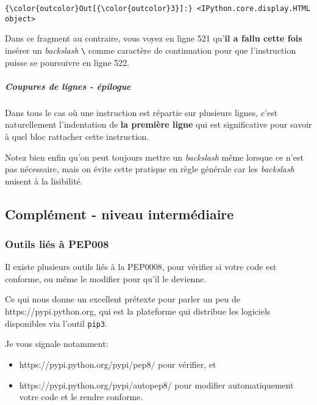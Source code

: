 \begin{Verbatim}[commandchars=\\\{\}]
{\color{outcolor}Out[{\color{outcolor}3}]:} <IPython.core.display.HTML object>
\end{Verbatim}
            
    Dans ce fragment au contraire, vous voyez en ligne 521 qu'\textbf{il a
fallu cette fois} insérer un \emph{backslash} \texttt{\textbackslash{}}
comme caractère de continuation pour que l'instruction puisse se
poursuivre en ligne 522.

    \hypertarget{coupures-de-lignes---uxe9pilogue}{%
\subparagraph{Coupures de lignes -
épilogue}\label{coupures-de-lignes---uxe9pilogue}}

    Dans tous le cas où une instruction est répartie sur plusieurs lignes,
c'est naturellement l'indentation de \textbf{la première ligne} qui est
significative pour savoir à quel bloc rattacher cette instruction.

    Notez bien enfin qu'on peut toujours mettre un \emph{backslash} même
lorsque ce n'est pas nécessaire, mais on évite cette pratique en règle
générale car les \emph{backslash} nuisent à la lisibilité.

    \hypertarget{compluxe9ment---niveau-intermuxe9diaire}{%
\subsection{Complément - niveau
intermédiaire}\label{compluxe9ment---niveau-intermuxe9diaire}}

    \hypertarget{outils-liuxe9s-uxe0-pep008}{%
\subsubsection{Outils liés à PEP008}\label{outils-liuxe9s-uxe0-pep008}}

Il existe plusieurs outils liés à la PEP0008, pour vérifier si votre
code est conforme, ou même le modifier pour qu'il le devienne.

Ce qui nous donne un excellent prétexte pour parler un peu de
https://pypi.python.org, qui est la plateforme qui distribue les
logiciels disponibles via l'outil \texttt{pip3}.

Je vous signale notamment:

\begin{itemize}
\tightlist
\item
  https://pypi.python.org/pypi/pep8/ pour vérifier, et
\item
  https://pypi.python.org/pypi/autopep8/ pour modifier automatiquement
  votre code et le rendre conforme.
\end{itemize}

